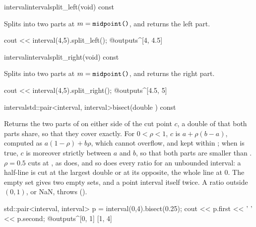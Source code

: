 \documentclass[12pt,a4paper,twoside,openright]{book}
\begin{document}
\begin{defmethod}{interval}{interval}{split\_left}{(void) const}
  \begin{operation}
  \end{operation}
  Splits  into two parts at $m=\texttt{midpoint()}$, and returns
  the left part.
  \begin{example}
cout << interval(4,5).split_left();
@outputs^[4, 4.5]~
  \end{example}
\end{defmethod}

\begin{defmethod}{interval}{interval}{split\_right}{(void) const}
  \begin{operation}
  \end{operation}
  Splits  into two parts at $m=\texttt{midpoint()}$, and returns
  the right part.
  \begin{example}
cout << interval(4,5).split_right();
@outputs^[4.5, 5]~
  \end{example}
\end{defmethod}

\begin{defmethod}{interval}{std::pair<interval, interval>}{bisect}{(double ) const}
  \begin{operation}
  \end{operation}
  Returns the two parts of  on either side of the cut point $c$,
  a double of  that both parts share, so that they cover
   exactly. For $0<\rho<1$, $c$ is $a+\rho(b-a)$, computed as
  $a(1-\rho)+b\rho$, which cannot overflow, and kept within ;
  when  is true, $c$ is moreover strictly between
  $a$ and $b$, so that both parts are smaller than . $\rho=0.5$
  cuts at , as  does, and so does every
  ratio for an unbounded interval: a half-line is cut at the largest double
  or at its opposite, the whole line at $0$. The empty set gives two empty
  sets, and a point interval itself twice. A ratio outside $(0,1)$, or NaN,
  throws  ().\newinvfive
  \begin{example}
std::pair<interval, interval> p = interval(0,4).bisect(0.25);
cout << p.first << ' ' << p.second;
@outputs^[0, 1] [1, 4]~
  \end{example}
\end{defmethod}
\end{document}
